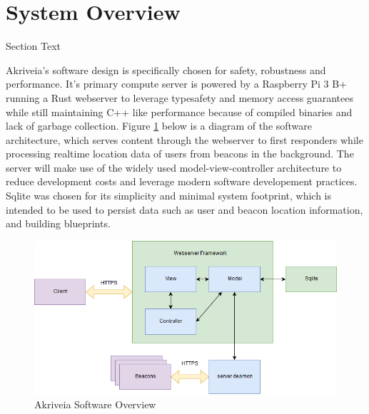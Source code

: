 %

\setcounter{section}{1}
\section{System Overview}
\bigskip
Section Text



Akriveia's software design is specifically chosen for safety, robustness and performance. It's primary compute server is
powered by a Raspberry Pi 3 B+ running a Rust webserver to leverage typesafety and memory access guarantees while still
maintaining C++ like performance because of compiled binaries and lack of garbage collection. Figure
\ref{software_diagram} below is a diagram of the software architecture, which serves content through the webserver to
first responders while processing realtime location data of users from beacons in the background. The server will make
use of the widely used model-view-controller architecture to reduce development costs and leverage modern software
developement practices. Sqlite was chosen for its simplicity and minimal system footprint, which is intended to be used
to persist data such as user and beacon location information, and building blueprints.

\begin{figure}[H]
\centering
    \includegraphics[scale=0.4]{./images/softwarediagram.png}
    \caption{Akriveia Software Overview}
	\label{software_diagram}
\end{figure}









%
